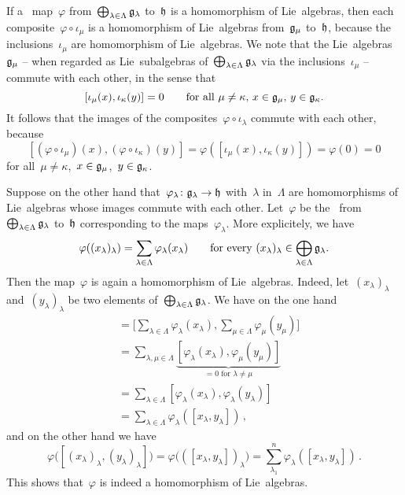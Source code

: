 \begin{example}
  If a~\linear{$\kf$} map~$\varphi$ from~$\bigoplus_{\lambda \in \Lambda} \mathfrak{g}_\lambda$ to~$\mathfrak{h}$ is a homomorphism of Lie~algebras, then each composite~$\varphi \circ \iota_\mu$ is a homomorphism of Lie~algebras from~$\mathfrak{g}_\mu$ to~$\mathfrak{h}$, because the inclusions~$\iota_\mu$ are homomorphism of Lie~algebras.
  We note that the Lie~algebras~$\mathfrak{g}_\mu$ -- when regarded as Lie~subalgebras of~$\bigoplus_{\lambda \in \Lambda} \mathfrak{g}_\lambda$ via the inclusions~$\iota_\mu$ -- commute with each other, in the sense that
  \[
    [ \iota_\mu(x), \iota_\kappa(y) ] = 0
    \qquad
    \text{for all~$\mu \neq \kappa$,~$x \in \mathfrak{g}_\mu$,~$y \in \mathfrak{g}_\kappa$.}
  \]
  It follows that the images of the composites~$\varphi \circ \iota_\lambda$ commute with each other, because
  \[
    [
      (\varphi \circ \iota_\mu)(x),
      (\varphi \circ \iota_\kappa)(y)
    ]
    =
    \varphi( [\iota_\mu(x), \iota_\kappa(y)] )
    =
    \varphi(0)
    =
    0
  \]
  for all~$\mu \neq \kappa$,~$x \in \mathfrak{g}_\mu$,~$y \in \mathfrak{g}_\kappa$.

  Suppose on the other hand that~$\varphi_\lambda \colon \glie_\lambda \to \hlie$ with~$\lambda$ in~$\Lambda$ are homomorphisms of Lie~algebras whose images commute with each other.
  Let~$\varphi$ be the~\linear{$\kf$} from~$\bigoplus_{\lambda \in \Lambda} \mathfrak{g}_\lambda$ to~$\mathfrak{h}$ corresponding to the maps~$\varphi_\lambda$.
  More explicitely, we have
  \[
    \varphi( (x_\lambda)_\lambda )
    =
    \sum_{\lambda \in \Lambda}
    \varphi_\lambda(x_\lambda)
    \qquad
    \text{for every~$(x_\lambda)_\lambda \in \bigoplus_{\lambda \in \Lambda} \mathfrak{g}_\lambda$.}
  \]
  Then the map~$\varphi$ is again a homomorphism of Lie~algebras.
  Indeed, let~$(x_\lambda)_\lambda$ and~$(y_\lambda)_\lambda$ be two elements of~$\bigoplus_{\lambda \in \Lambda} \mathfrak{g}_\lambda$.
  We have on the one hand
  \begin{align*}
    [
      \varphi( (x_\lambda)_\lambda ),
      \varphi( (y_\lambda)_\lambda )
    ]
    &=
    \Biggl[
      \sum_{\lambda \in \Lambda}
      \varphi_\lambda( x_\lambda ) ,
      \sum_{\mu \in \Lambda}
      \varphi_\mu( y_\mu )
    \Biggr]
    \\
    &=
    \sum_{\lambda, \mu \in \Lambda}
    \underbrace{
      [ \varphi_\lambda( x_\lambda ) , \varphi_\mu( y_\mu ) ]
    }_{
      \text{$= 0$ for~$\lambda \neq \mu$}
    }
    \\
    &=
    \sum_{\lambda \in \Lambda} [ \varphi_\lambda( x_\lambda ), \varphi_\lambda( y_\lambda ) ]
    \\
    &=
    \sum_{\lambda \in \Lambda} \varphi_\lambda( [ x_\lambda , y_\lambda ] ) \,,
  \end{align*}
  and on the other hand we have
  \[
    \varphi\bigl( [ (x_\lambda)_\lambda, (y_\lambda)_\lambda ] \bigr)
    =
    \varphi\bigl( ( [x_\lambda, y_\lambda] )_\lambda \bigr)
    =
    \sum_{\lambda_1}^n \varphi_\lambda( [ x_\lambda, y_\lambda ] ) \,.
  \]
  This shows that~$\varphi$ is indeed a homomorphism of Lie~algebras.


\end{example}
